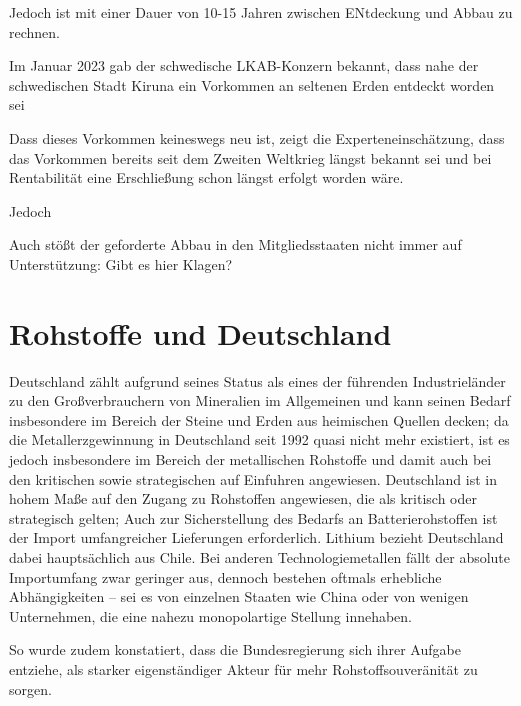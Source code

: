 \documentclass[12pt,a4paper,oneside]{book} %
\begin{document}
Jedoch ist mit einer Dauer von 10-15 Jahren zwischen ENtdeckung und Abbau zu rechnen.


Im Januar 2023 gab der schwedische LKAB-Konzern bekannt, dass nahe der schwedischen Stadt Kiruna ein Vorkommen an seltenen Erden entdeckt worden sei 

Dass dieses Vorkommen keineswegs neu ist, zeigt die Experteneinschätzung, dass das Vorkommen bereits seit dem Zweiten Weltkrieg längst bekannt sei und bei Rentabilität eine Erschließung schon längst erfolgt worden wäre.\autocite{VDi Nachrichten: Seltene Erden: Deutschland importiert lieber, als selbst zu fördern}


Jedoch 

Auch stößt der geforderte Abbau in den Mitgliedsstaaten nicht immer auf Unterstützung: Gibt es hier Klagen?

\section{Rohstoffe und Deutschland}

Deutschland zählt aufgrund seines Status als eines der führenden Industrieländer zu den Großverbrauchern von Mineralien im Allgemeinen und kann seinen Bedarf insbesondere im Bereich der Steine und Erden aus heimischen Quellen decken; da die Metallerzgewinnung in Deutschland seit 1992 quasi nicht mehr existiert, ist es jedoch insbesondere im Bereich der metallischen Rohstoffe und damit auch bei den kritischen sowie strategischen auf Einfuhren angewiesen. \autocites{Bericht zur Rohstoffsituation in Deutschland 2023, S. 10ff.}{	Commodity TopNews 73, S. 3} Deutschland ist in hohem Maße auf den Zugang zu Rohstoffen angewiesen, die als kritisch oder strategisch gelten; Auch zur Sicherstellung des Bedarfs an Batterierohstoffen ist der Import umfangreicher Lieferungen erforderlich. Lithium bezieht Deutschland dabei hauptsächlich aus Chile. Bei anderen Technologiemetallen fällt der absolute Importumfang zwar geringer aus, dennoch bestehen oftmals erhebliche Abhängigkeiten – sei es von einzelnen Staaten wie China oder von wenigen Unternehmen, die eine nahezu monopolartige Stellung innehaben.




So wurde zudem konstatiert, dass die Bundesregierung sich ihrer Aufgabe entziehe, \glqq  als starker eigenständiger Akteur für mehr Rohstoffsouveränität zu sorgen\grqq.\autocite{Wirtschaft fordert mehr Tempo bei Rohstofffonds}
\end{document}
